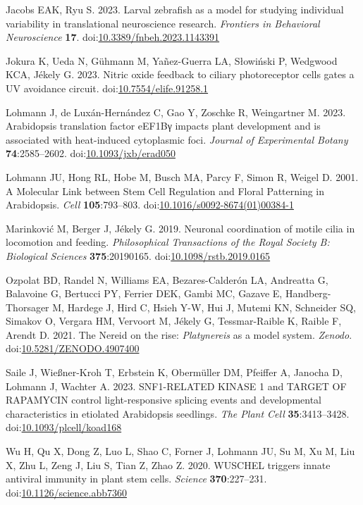 \documentclass[
  11pt,
]{article}
\newlength{\cslhangindent}
\newenvironment{CSLReferences}[2] %
 {\begin{list}{}{%
  \setlength{\itemindent}{0pt}
  \setlength{\leftmargin}{0pt}
  \setlength{\parsep}{0pt}
  \ifodd #1
   \setlength{\leftmargin}{\cslhangindent}
   \setlength{\itemindent}{-1\cslhangindent}
  \fi
  \setlength{\itemsep}{#2\baselineskip}}}
 {\end{list}}
\begin{document}
\label{refs}
\begin{CSLReferences}{1}{0}
Jacobs EAK, Ryu S. 2023. Larval zebrafish as a model for studying
individual variability in translational neuroscience research.
\emph{Frontiers in Behavioral Neuroscience} \textbf{17}.
doi:\href{https://doi.org/10.3389/fnbeh.2023.1143391}{10.3389/fnbeh.2023.1143391}

Jokura K, Ueda N, Gühmann M, Yañez-Guerra LA, Słowiński P, Wedgwood KCA,
Jékely G. 2023. Nitric oxide feedback to ciliary photoreceptor cells
gates a UV avoidance circuit.
doi:\href{https://doi.org/10.7554/elife.91258.1}{10.7554/elife.91258.1}

Lohmann J, de Luxán-Hernández C, Gao Y, Zoschke R, Weingartner M. 2023.
Arabidopsis translation factor eEF1Bγ impacts plant development and is
associated with heat-induced cytoplasmic foci. \emph{Journal of
Experimental Botany} \textbf{74}:2585--2602.
doi:\href{https://doi.org/10.1093/jxb/erad050}{10.1093/jxb/erad050}

Lohmann JU, Hong RL, Hobe M, Busch MA, Parcy F, Simon R, Weigel D. 2001.
A Molecular Link between Stem Cell Regulation and Floral Patterning in
Arabidopsis. \emph{Cell} \textbf{105}:793--803.
doi:\href{https://doi.org/10.1016/s0092-8674(01)00384-1}{10.1016/s0092-8674(01)00384-1}

Marinković M, Berger J, Jékely G. 2019. Neuronal coordination of motile
cilia in locomotion and feeding. \emph{Philosophical Transactions of the
Royal Society B: Biological Sciences} \textbf{375}:20190165.
doi:\href{https://doi.org/10.1098/rstb.2019.0165}{10.1098/rstb.2019.0165}

Ozpolat BD, Randel N, Williams EA, Bezares-Calderón LA, Andreatta G,
Balavoine G, Bertucci PY, Ferrier DEK, Gambi MC, Gazave E,
Handberg-Thorsager M, Hardege J, Hird C, Hsieh Y-W, Hui J, Mutemi KN,
Schneider SQ, Simakov O, Vergara HM, Vervoort M, Jékely G,
Tessmar-Raible K, Raible F, Arendt D. 2021. The Nereid on the rise:
\emph{Platynereis} as a model system. \emph{Zenodo}.
doi:\href{https://doi.org/10.5281/ZENODO.4907400}{10.5281/ZENODO.4907400}

Saile J, Wießner-Kroh T, Erbstein K, Obermüller DM, Pfeiffer A, Janocha
D, Lohmann J, Wachter A. 2023. SNF1-RELATED KINASE 1 and TARGET OF
RAPAMYCIN control light-responsive splicing events and developmental
characteristics in etiolated Arabidopsis seedlings. \emph{The Plant
Cell} \textbf{35}:3413--3428.
doi:\href{https://doi.org/10.1093/plcell/koad168}{10.1093/plcell/koad168}

Wu H, Qu X, Dong Z, Luo L, Shao C, Forner J, Lohmann JU, Su M, Xu M, Liu
X, Zhu L, Zeng J, Liu S, Tian Z, Zhao Z. 2020. WUSCHEL triggers innate
antiviral immunity in plant stem cells. \emph{Science}
\textbf{370}:227--231.
doi:\href{https://doi.org/10.1126/science.abb7360}{10.1126/science.abb7360}

\end{CSLReferences}
\end{document}
